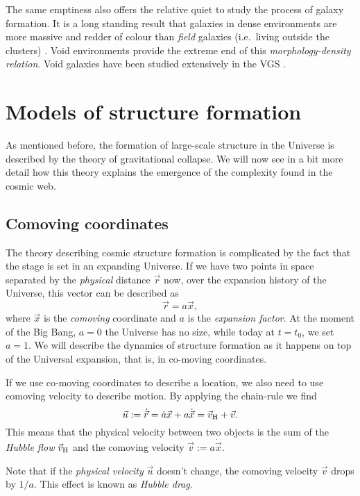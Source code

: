 The same emptiness also offers the relative quiet to study the process of galaxy formation. It is a long standing result that galaxies in dense environments are more massive and redder of colour than \emph{field} galaxies (i.e.\ living  outside the clusters) \citep{Dressler1980}. Void environments provide the extreme end of this \emph{morphology-density relation}. Void galaxies have been studied extensively in the \acf{VGS} \citep{Kreckel2012,Beygu2014}.

\clearpage
\section{Models of structure formation}\label{section:modelsofstructureformation}
As mentioned before, the formation of large-scale structure in the Universe is described by the theory of gravitational collapse. We will now see in a bit more detail how this theory explains the emergence of the complexity found in the cosmic web.

\subsection{Comoving coordinates}
The theory describing cosmic structure formation is complicated by the fact that the stage is set in an expanding Universe. If we have two points in space separated by the \emph{physical} distance $\vec{r}$ now, over the expansion history of the Universe, this vector can be described as
\[\vec{r} = a \vec{x},\]
where $\vec{x}$ is the \emph{comoving} coordinate and $a$ is the \emph{expansion factor}. At the moment of the Big Bang, $a = 0$ the Universe has no size, while today at $t = t_{0}$, we set $a = 1$. We will describe the dynamics of structure formation as it happens on top of the Universal expansion, that is, in co-moving coordinates.

If we use co-moving coordinates to describe a location, we also need to use comoving velocity to describe motion. By applying the chain-rule we find
\[\vec{u} := \dot{\vec{r}} = \dot{a}\vec{x} + a\dot{\vec{x}} = \vec{v}_{\rm H} + \vec{v}.\]
This means that the physical velocity between two objects is the sum of the \emph{Hubble flow} $\vec{v}_{\rm H}$ and the comoving velocity $\vec{v} := a\dot{\vec{x}}$.

Note that if the \emph{physical velocity} $\vec{u}$ doesn't change, the comoving velocity $\vec{v}$ drops by $1/a$. This effect is known as \emph{Hubble drag}.


